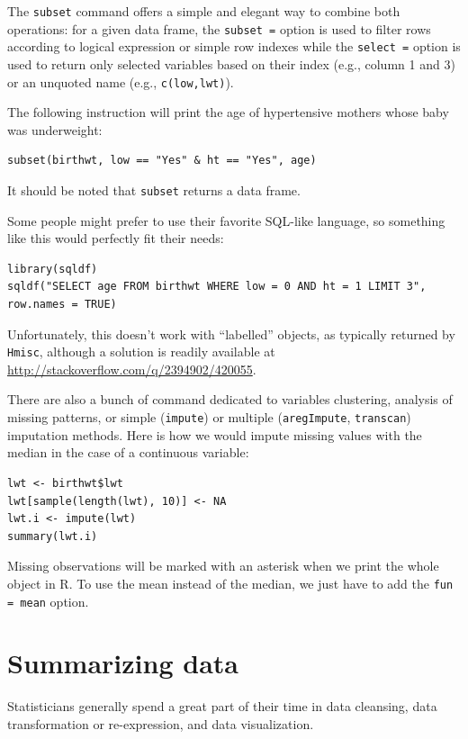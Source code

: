 \documentclass[a4paper,twoside]{book}
\renewcommand{\texttt}[1]{\lstinline{#1}}
\begin{document}
The \texttt{subset} command offers a simple and elegant way to combine both
operations: for a given data frame, the \texttt{subset =} option is used to
filter rows according to logical expression or simple row indexes while the
\texttt{select =} option is used to return only selected variables based on
their index (e.g., column 1 and 3) or an unquoted name (e.g.,
\texttt{c(low,lwt)}). 

The following instruction will print the age of hypertensive mothers whose
baby was underweight:
\begin{verbatim}
subset(birthwt, low == "Yes" & ht == "Yes", age)
\end{verbatim}
It should be noted that \texttt{subset} returns a data frame.

Some people might prefer to use their favorite SQL-like language, so
something like this would perfectly fit their needs:
\begin{verbatim}
library(sqldf)
sqldf("SELECT age FROM birthwt WHERE low = 0 AND ht = 1 LIMIT 3", row.names = TRUE)
\end{verbatim}

Unfortunately, this doesn't work with ``labelled'' objects, as typically
returned by \texttt{Hmisc}, although a solution is readily available at \url{http://stackoverflow.com/q/2394902/420055}.

There are also a bunch of command dedicated to variables clustering,
analysis of missing patterns, or simple (\texttt{impute}) or multiple
(\texttt{aregImpute}, \texttt{transcan}) imputation methods. Here is how we
would impute missing values with the median in the case of a continuous
variable:
\begin{verbatim}
lwt <- birthwt$lwt
lwt[sample(length(lwt), 10)] <- NA
lwt.i <- impute(lwt)
summary(lwt.i)
\end{verbatim}

Missing observations will be marked with an asterisk when we print the whole
object in R. To use the mean instead of the median, we just have to add the
\texttt{fun = mean} option.

\section{Summarizing data}
Statisticians generally spend a great part of their time in data
cleansing, data transformation or re-expression\autocite{hoaglin83},
and data visualization. 
\end{document}
